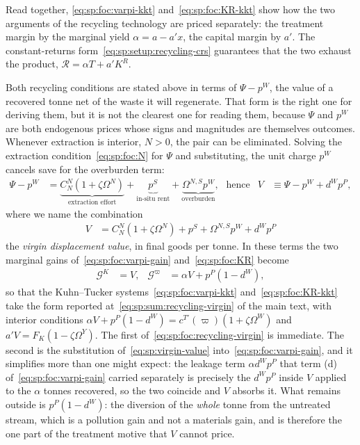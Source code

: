 Read together, \eqref{eq:sp:foc:varpi-kkt} and~\eqref{eq:sp:foc:KR-kkt} show how the two arguments of the recycling technology are priced separately: the treatment margin by the marginal yield $\alpha=a-a'x$, the capital margin by $a'$. The constant-returns form~\eqref{eq:sp:setup:recycling-crs} guarantees that the two exhaust the product, $\mathcal R=\alpha T+a'K^R$.

 Both recycling conditions are stated above in terms
of $\Psi-p^W$, the value of a recovered tonne net of the waste it will regenerate. That form is the
right one for deriving them, but it is not the clearest one for reading them, because $\Psi$ and
$p^W$ are both endogenous prices whose signs and magnitudes are themselves outcomes. Whenever
extraction is interior, $N>0$, the pair can be eliminated. Solving the extraction
condition~\eqref{eq:sp:foc:N} for $\Psi$ and substituting, the unit charge $p^W$ cancels save for the
overburden term:
\begin{align}
\Psi-p^W &= \underbrace{C^N_N\left(1+\zeta\Omega^N\right)}_{\text{extraction effort}}
+\underbrace{p^S}_{\text{in-situ rent}}
+\underbrace{\Omega^{N,S}p^W}_{\text{overburden}} ,
&&\text{hence}
&
V &\equiv \Psi-p^W+d^Wp^P ,
\label{eq:sp:virgin-value}
\end{align}
where we name the combination
\begin{align}
V &= C^N_N\left(1+\zeta\Omega^N\right)+p^S+\Omega^{N,S}p^W+d^Wp^P
\label{eq:sp:V}
\end{align}
the \emph{virgin displacement value}, in final goods per tonne. In these terms the two marginal gains
of~\eqref{eq:sp:foc:varpi-gain} and~\eqref{eq:sp:foc:KR} become
\begin{align}
\mathcal G^K &= V,
&
\mathcal G^\varpi &= \alpha V+p^P\left(1-d^W\right),
\label{eq:sp:foc:recycling-virgin}
\end{align}
so that the Kuhn--Tucker systems~\eqref{eq:sp:foc:varpi-kkt} and~\eqref{eq:sp:foc:KR-kkt} take the
form reported at~\eqref{eq:sp:sum:recycling-virgin} of the main text, with interior conditions
$\alpha V+p^P\left(1-d^W\right)=c^{T\prime}\left(\varpi\right)\left(1+\zeta\Omega^W\right)$ and
$a'V=F_K\left(1-\zeta\Omega^Y\right)$.
The first of~\eqref{eq:sp:foc:recycling-virgin} is immediate. The second is the substitution
of~\eqref{eq:sp:virgin-value} into~\eqref{eq:sp:foc:varpi-gain}, and it simplifies more than one might
expect: the leakage term $\alpha d^Wp^P$ that term (d) of~\eqref{eq:sp:foc:varpi-gain} carried separately
is precisely the $d^Wp^P$ inside $V$ applied to the $\alpha$ tonnes recovered, so the two coincide
and $V$ absorbs it. What remains outside is $p^P\left(1-d^W\right)$: the diversion of the
\emph{whole} tonne from the untreated stream, which is a pollution gain and not a materials gain, and
is therefore the one part of the treatment motive that $V$ cannot price.

